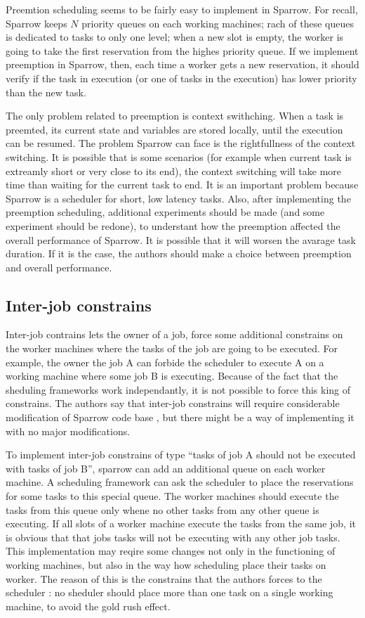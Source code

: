 \documentclass[11pt]{article}
\begin{document}
		Preemtion scheduling seems to be fairly easy to implement in Sparrow. For recall, Sparrow keeps $N$ priority queues on each working machines; rach of these queues is dedicated to tasks to only one level; when a new slot is empty, the worker is going to take the first reservation from the highes priority queue. If we implement preemption in Sparrow, then, each time a worker gets a new reservation, it should verify if the task in execution (or one of tasks in the execution) has lower priority than the new task.
		
		The only problem related to preemption is context swithching. When a task is preemted, its current state and variables are stored locally, until the execution can be resumed. The problem Sparrow can face is the rightfullness of the context switching. It is possible that is some scenarios (for example when current task is extreamly short or very close to its end), the context switching will take more time than waiting for the current task to end. It is an important problem because Sparrow is a scheduler for short, low latency tasks. Also, after implementing the preemption scheduling, additional experiments should be made (and some experiment should be redone), to understant how the preemption affected the overall performance of Sparrow. It is possible that it will worsen the avarage task duration. If it is the case, the authors should make a choice between preemption and overall performance.
		
		
	\subsection{Inter-job constrains}
	
		Inter-job contrains lets the owner of a job, force some additional constrains on the worker machines where the tasks of the job are going to be executed. For example, the owner the job A can forbide the scheduler to execute A on a working machine where some job B is executing. Because of the fact that the sheduling frameworks work independantly, it is not possible to force this king of constrains. The authors say that inter-job constrains will require considerable modification of Sparrow code base \cite[section 8]{sparrow}, but there might be a way of implementing it with no major modifications.
		
		To implement inter-job constrains of type ``tasks of job A should not be executed with tasks of job B'', sparrow can add an additional queue on each worker machine. A scheduling framework can ask the scheduler to place the reservations for some tasks to this special queue. The worker machines should execute the tasks from this queue only whene no other tasks from any other queue is executing. If all slots of a worker machine execute the tasks from the same job, it is obvious that that jobs tasks will not be executing with any other job tasks. This implementation may reqire some changes not only in the functioning of working machines, but also in the way how scheduling place their tasks on worker. The reason of this is the constrains that the authors forces to the scheduler \cite[section 5]{sparrow}: no sheduler should place more than one task on a single working machine, to avoid the gold rush effect.
		
\end{document}
